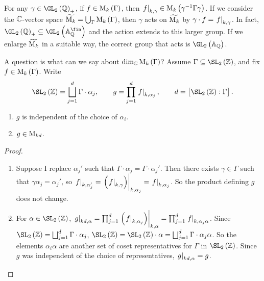 \begin{note*}
For any $ \gamma \in \GL_2\br{\QQ}_+ $, if $ f \in \M_k\br{\Gamma} $, then $ \eval{f}_{k, \gamma} \in \M_k\br{\gamma^{-1}\Gamma\gamma} $. If we consider the $ \mathbb{C} $-vector space $ \widetilde{\M_k} = \bigcup_\Gamma \M_k\br{\Gamma} $, then $ \gamma $ acts on $ \widetilde{\mathrm{M}_k} $ by $ \gamma \cdot f = \left. f \right|_{k, \gamma} $. In fact, $ \GL_2\br{\QQ}_+ \subseteq \GL_2\br{\AA_\QQ^{\fin}} $ and the action extends to this larger group. If we enlarge $ \widetilde{\mathrm{M}_k} $ in a suitable way, the correct group that acts is $ \GL_2\br{\AA_\QQ} $.
\end{note*}

A question is what can we say about $ \dim_\CC \M_k\br{\Gamma} $? Assume $ \Gamma \subseteq \SL_2\br{\ZZ} $, and fix $ f \in \M_k\br{\Gamma} $. Write
$$ \SL_2\br{\ZZ} = \bigsqcup_{j = 1}^d \Gamma \cdot \alpha_j, \qquad g = \prod_{j = 1}^d \eval{f}_{k, \alpha_j}, \qquad d = \sbr{\SL_2\br{\ZZ} : \Gamma}. $$

\begin{proposition}
\hfill
\begin{enumerate}
\item $ g $ is independent of the choice of $ \alpha_i $.
\item $ g \in \mathrm{M}_{kd} $.
\end{enumerate}
\end{proposition}

\begin{proof}
\hfill
\begin{enumerate}
\item Suppose I replace $ \alpha_j' $ such that $ \Gamma \cdot \alpha_j = \Gamma \cdot \alpha_j' $. Then there exists $ \gamma \in \Gamma $ such that $ \gamma\alpha_j = \alpha_j' $, so $ \eval{f}_{k, \alpha_j'} = \eval{\br{\eval{f}_{k, \gamma}}}_{k, \alpha_j} = \eval{f}_{k, \alpha_j} $. So the product defining $ g $ does not change.
\item For $ \alpha \in \SL_2\br{\ZZ} $, $ \eval{g}_{kd, \alpha} = \prod_{j = 1}^d \eval{\br{\eval{f}_{k, \alpha_j}}}_{k, \alpha} = \prod_{j = 1}^d \eval{f}_{k, \alpha_j\alpha} $. Since $ \SL_2\br{\ZZ} = \bigsqcup_{j = 1}^d \Gamma \cdot \alpha_j $, $ \SL_2\br{\ZZ} = \SL_2\br{\ZZ} \cdot \alpha = \bigsqcup_{j = 1}^d \Gamma \cdot \alpha_j\alpha $. So the elements $ \alpha_i\alpha $ are another set of coset representatives for $ \Gamma $ in $ \SL_2\br{\ZZ} $. Since $ g $ was independent of the choice of representatives, $ \left. g \right|_{kd, \alpha} = g $.
\end{enumerate}
\end{proof}

